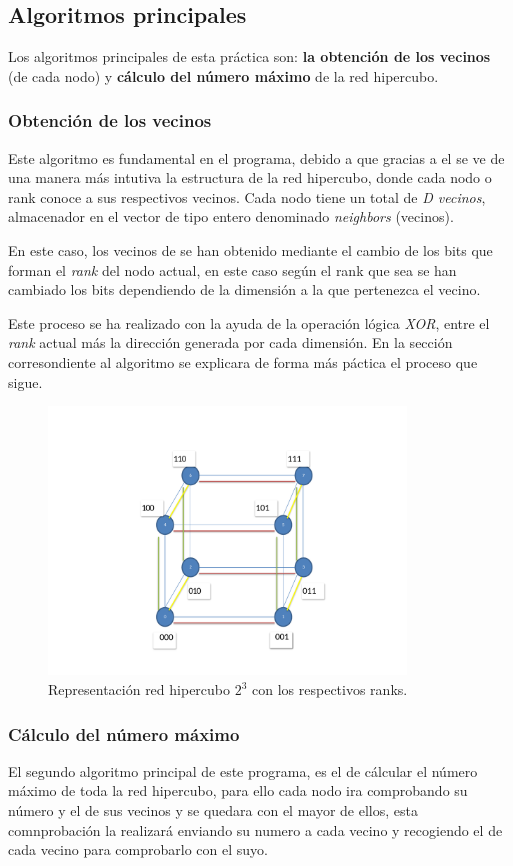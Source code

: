 \documentclass[11pt]{article}
\begin{document}
\subsection{Algoritmos principales}
Los algoritmos principales de esta práctica son: \textbf{la obtención de los vecinos} (de cada nodo) y \textbf{cálculo del número máximo} de la red hipercubo.

\subsubsection{Obtención de los vecinos}
Este algoritmo es fundamental en el programa, debido a que gracias a el se ve de una manera más intutiva la estructura de la red hipercubo, donde cada nodo o rank conoce a sus respectivos vecinos. Cada nodo tiene un total de \textit{D vecinos}, almacenador en el vector de tipo entero denominado \textit{neighbors} (vecinos).

En este caso, los vecinos de se han obtenido mediante el cambio de los bits que forman el \textit{rank} del nodo actual, en este caso según el rank que sea se han cambiado los bits dependiendo de la dimensión a la que pertenezca el vecino.

Este proceso se ha realizado con la ayuda de la operación lógica \textit{XOR}, entre el \textit{rank} actual más la dirección generada por cada dimensión.
En la sección corresondiente al algoritmo se explicara de forma más páctica el proceso que sigue.

\begin{figure}[H]
  \centering
    \includegraphics[width=95mm]{hipercubo.pdf}
  \caption{Representación red hipercubo $2^3$ con los respectivos ranks.}
  \label{fig:matriz}
\end{figure}


\subsubsection{Cálculo del número máximo}
El segundo algoritmo principal de este programa, es el de cálcular el número máximo de toda la red hipercubo, para ello cada nodo ira comprobando su número y el de sus vecinos y se quedara con el mayor de ellos, esta comnprobación la realizará enviando su numero a cada vecino y recogiendo el de cada vecino para comprobarlo con el suyo.
\end{document}
